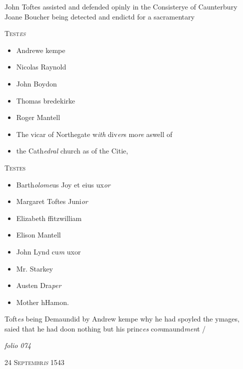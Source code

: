 \documentclass[12pt, a4paper]{book}
\begin{document}
		\ifthenelse{\isodd{\thepage}}
		{\reversemarginpar}
		{\normalmarginpar}
		John Toftes assisted and defended opinly in the
		Consisterye of Caunterbury Joane Boucher
 being detected and endictd for a sacramentary
\begin{center} {\scshape Test\textit{es}} \end{center}\begin{itemize}
	\item[]Andrewe kempe
	\item[]Nicolas Raynold
	\item[]John Boydon
	\item[]Thomas bredekirke
	\item[]Roger Mantell
	\item[]The vicar of Northegate w\textit{ith} div\textit{er}s mo\textit{re} aswell of
	\item[]the Cath\textit{edral }church as of the Citie,\end{itemize}
 
 	\begin{center} {\scshape Testes} \end{center}\begin{itemize}
 		
 		\item[]Barth\textit{olome}us Joy et eius ux\textit{or}
 		\item[]Margaret Toftes Juni\textit{or}
 		\item[]Elizabeth ffitzwilliam
 		\item[]Elison Mantell
 		\item[]John Lynd cu\textit{m} uxor
 		\item[]Mr. Starkey
 		\item[]Austen Dra\textit{per}
 		\item[]Mother hHamon.
 	\end{itemize}
 
	
		\ifthenelse{\isodd{\thepage}}
		{\reversemarginpar}
		{\normalmarginpar}
		Toft\textit{es} being Demaundid by Andrew kempe
 why he had spoyled the ymages, saied that
 he had doon nothing but his princ\textit{es} co\textit{m}maund\textit{men}t /


            
            
\dotfill
						\newpage
{}

\textit{folio 074}


            
               
				\begin{center} \begin{large} {\scshape 
                  24 Septembr\textit{is} 1543
               } \end{large} \end{center}
			
\end{document}
